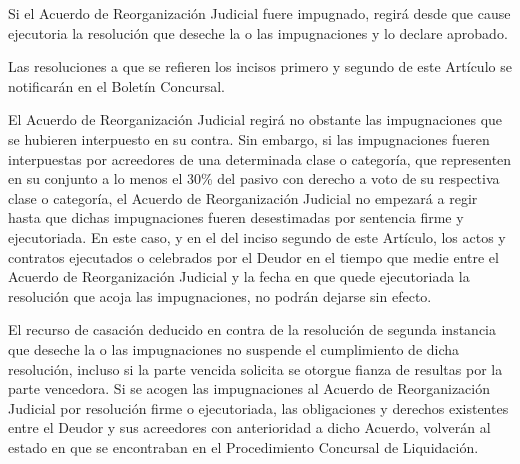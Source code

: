\documentclass[
]{book}
\begin{document}
Si el Acuerdo de Reorganización Judicial fuere impugnado, regirá desde que cause ejecutoria la resolución que deseche la o las impugnaciones y lo declare aprobado.

Las resoluciones a que se refieren los incisos primero y segundo de este Artículo se notificarán en el Boletín Concursal.

El Acuerdo de Reorganización Judicial regirá no obstante las impugnaciones que se hubieren interpuesto en su contra. Sin embargo, si las impugnaciones fueren interpuestas por acreedores de una determinada clase o categoría, que representen en su conjunto a lo menos el 30\% del pasivo con derecho a voto de su respectiva clase o categoría, el Acuerdo de Reorganización Judicial no empezará a regir hasta que dichas impugnaciones fueren desestimadas por sentencia firme y ejecutoriada. En este caso, y en el del inciso segundo de este Artículo, los actos y contratos ejecutados o celebrados por el Deudor en el tiempo que medie entre el Acuerdo de Reorganización Judicial y la fecha en que quede ejecutoriada la resolución que acoja las impugnaciones, no podrán dejarse sin efecto.

El recurso de casación deducido en contra de la resolución de segunda instancia que deseche la o las impugnaciones no suspende el cumplimiento de dicha resolución, incluso si la parte vencida solicita se otorgue fianza de resultas por la parte vencedora.
Si se acogen las impugnaciones al Acuerdo de Reorganización Judicial por resolución firme o ejecutoriada, las obligaciones y derechos existentes entre el Deudor y sus acreedores con anterioridad a dicho Acuerdo, volverán al estado en que se encontraban en el Procedimiento Concursal de Liquidación.

  
\end{document}
